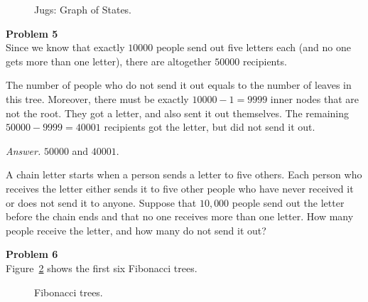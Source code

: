 \documentclass[jou]{apa6}
\begin{document}
\begin{figure}[!htb]
\caption{\label{fig:water-jugs} Jugs: Graph of States.}
\end{figure}





\vspace{10pt}
{\bf Problem 5}\\
Since we know that exactly $10000$ people send out 
five letters each (and no one gets more than one letter), 
there are altogether $50000$ recipients. 

The number of people who do not send it out equals to the number 
of leaves in this tree. Moreover, there must be 
exactly $10000-1 = 9999$ inner nodes that are not the root. 
They got a letter, and also sent it out themselves. 
The remaining $50000 - 9999 = 40001$ recipients got the letter, 
but did not send it out.

{\em Answer.} $50000$ and $40001$.


A chain letter starts when a person sends a letter to five others. 
Each person who receives the letter either sends it to five other people
who have never received it or does not send it to anyone. Suppose that 
$10,000$ people send out the letter before the chain ends and that no one receives
more than one letter. How many people receive the letter, and how many 
do not send it out?


\vspace{6pt}
{\bf Problem 6}\\
Figure~\ref{fig:fibonacci-trees} shows the first six Fibonacci trees. 

\begin{figure}[!htb]
\caption{\label{fig:fibonacci-trees} Fibonacci trees.}
\end{figure}
\end{document}
